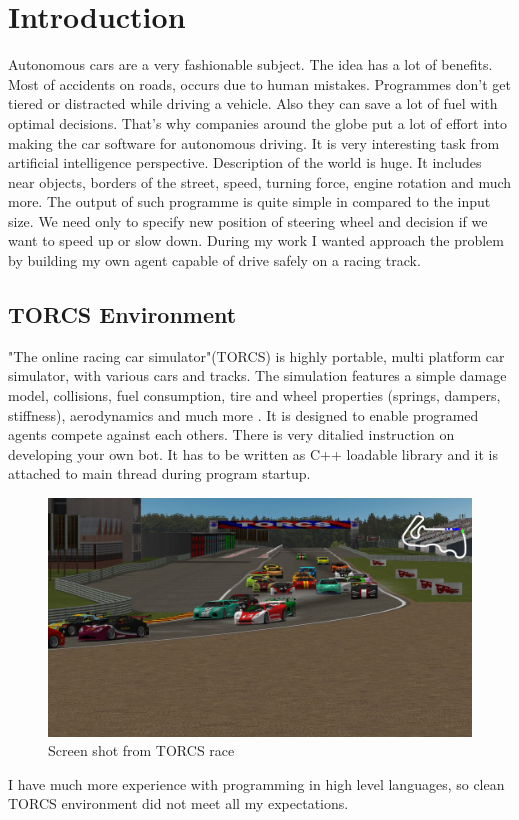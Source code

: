 \documentclass[declaration,shortabstract,english,inz]{iithesis}
\author         {Kacper Kulczak}
\begin{document}

\chapter{Introduction}

Autonomous cars are a very fashionable subject. The idea has a lot of benefits. Most of accidents on roads, occurs due to human mistakes. Programmes don't get tiered or distracted while driving a vehicle. Also they can save a lot of fuel with optimal decisions.
That's why companies around the globe put a lot of effort into making the car software for autonomous driving. It is very interesting task from artificial intelligence perspective. Description of the world is huge. It includes near objects, borders of the street, speed, turning force, engine rotation and much more. The output of such programme is quite simple in compared to the input size. We need only to specify new position of steering wheel and decision if we want to speed up or slow down. During my work I wanted approach the problem by building my own agent capable of drive safely on a racing track.




\section{TORCS Environment}
"The online racing car simulator"(TORCS) is highly portable, multi platform car simulator, with various cars and tracks.  The simulation features a simple damage model, collisions, fuel consumption, tire and wheel properties (springs, dampers, stiffness), aerodynamics and much more \cite{TORCS}.  It is designed to enable programed agents compete against each others. There is very ditalied instruction on developing your  own bot. It has to be written as C++ loadable library and it is attached to main thread during program startup.


\begin{figure}[h]
    \includegraphics[width=\linewidth]{img/torcs_look.jpeg}
    \caption{Screen shot from TORCS race \cite{TORCS}}
    \label{fig:torcs}
\end{figure}
I have much more experience with programming in high level languages, so clean TORCS environment did not meet all my expectations. 
\end{document}
